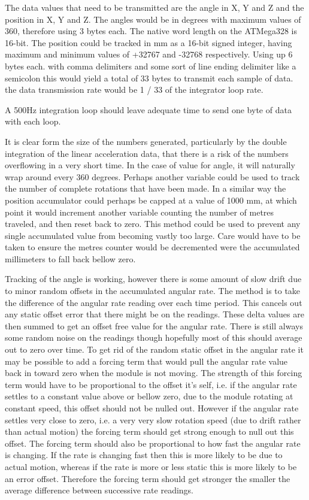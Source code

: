\documentclass[10pt, a4paper]{article}
\def\vs{\vspace{6pt}}
\begin{document}
\vs
The data values that need to be transmitted are the angle in X, Y and Z and the position in X, Y and Z. The angles would be in degrees with maximum values of 360, therefore using 3 bytes each. The native word length on the ATMega328 is 16-bit. The position could be tracked in mm as a 16-bit signed integer, having maximum and minimum values of +32767 and -32768 respectively. Using up 6 bytes each.
with comma delimiters and some sort of line ending delimiter like a semicolon this would yield a total of 33 bytes to transmit each sample of data. the data transmission rate would be 1 / 33 of the integrator loop rate.

\vs
A 500Hz integration loop should leave adequate time to send one byte of data with each loop.

\vs
It is clear form the size of the numbers generated, particularly by the double integration of the linear acceleration data, that there is a risk of the numbers overflowing in a very short time. In the case of value for angle, it will naturally wrap around every 360 degrees. Perhaps another variable could be used to track the number of complete rotations that have been made. In a similar way the position accumulator could perhaps be capped at a value of 1000 mm, at which point it would increment another variable counting the number of metres traveled, and then reset back to zero. This method could be used to prevent any single accumulated value from becoming vastly too large. Care would have to be taken to ensure the metres counter would be decremented were the accumulated millimeters to fall back bellow zero.


\vs
Tracking of the angle is working, however there is some amount of slow drift due to minor random offsets in the accumulated angular rate. The method is to take the difference of the angular rate reading over each time period. This cancels out any static offset error that there might be on the readings. These delta values are then summed to get an offset free value for the angular rate. There is still always some random noise on the readings though hopefully most of this should average out to zero over time.
To get rid of the random static offset in the angular rate it may be possible to add a forcing term that would pull the angular rate value back in toward zero when the module is not moving. The strength of this forcing term would have to be proportional to the offset it's self, i.e. if the angular rate settles to a constant value above or bellow zero, due to the module rotating at constant speed, this offset should not be nulled out. However if the angular rate settles very close to zero, i.e. a very very slow rotation speed (due to drift rather than actual motion) the forcing term should get strong enough to null out this offset.
The forcing term should also be proportional to how fast the angular rate is changing. If the rate is changing fast then this is more likely to be due to actual motion, whereas if the rate is more or less static this is more likely to be an error offset. Therefore the forcing term should get stronger the smaller the average difference between successive rate readings.
\end{document}

